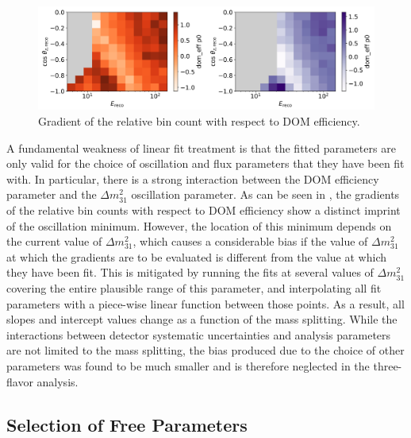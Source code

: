 \begin{figure}
    \centering
    \includegraphics[width=0.9\linewidth]{figures/measurement/systematics/detector/dom_eff_slopes.png}
    \caption{Gradient of the relative bin count with respect to DOM efficiency.}
    \label{fig:dom-efficiency-slopes}
\end{figure}
A fundamental weakness of linear fit treatment is that the fitted parameters are only valid for the  choice of oscillation and flux parameters that they have been fit with. In particular, there is a strong interaction between the DOM efficiency parameter and the $\Delta m^2_{31}$ oscillation parameter. As can be seen in , the gradients of the relative bin counts with respect to DOM efficiency show a distinct imprint of the oscillation minimum. However, the location of this minimum depends on the current value of $\Delta m^2_{31}$, which causes a considerable bias if the value of $\Delta m^2_{31}$ at which the gradients are to be evaluated is different from the value at which they have been fit. This is mitigated by running the fits at several values of $\Delta m^2_{31}$ covering the entire plausible range of this parameter, and interpolating all fit parameters with a piece-wise linear function between those points. As a result, all slopes and intercept values change as a function of the mass splitting. While the interactions between detector systematic uncertainties and analysis parameters are not limited to the mass splitting, the bias produced due to the choice of other parameters was found to be much smaller and is therefore neglected in the three-flavor analysis. 

\subsection{Selection of Free Parameters}
\label{sec:std-osc-free-parameters}

